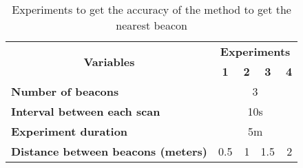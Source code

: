 \begin{table}[]
\centering
\begin{tabular}{@{}lcccc@{}}
\toprule
\multicolumn{1}{c}{\multirow{2}{*}{\textbf{Variables}}} & \multicolumn{4}{c}{\textbf{Experiments}}                                                          \\ \cmidrule(l){2-5}
\multicolumn{1}{c}{}                                    & \textbf{1}              & \textbf{2}            & \textbf{3}              & \textbf{4}            \\ \midrule
\textbf{Number of beacons}                              & \multicolumn{4}{c}{3}                                                                             \\
\textbf{Interval between each scan}                     & \multicolumn{4}{c}{10s}                                                                           \\
\textbf{Experiment duration}                            & \multicolumn{4}{c}{5m}                                                                            \\
\textbf{Distance between beacons (meters)}              & \multicolumn{1}{r}{0.5} & \multicolumn{1}{r}{1} & \multicolumn{1}{r}{1.5} & \multicolumn{1}{r}{2} \\ \bottomrule
\end{tabular}
\caption[Nearest beacon experiments summary]{Experiments to get the accuracy of the method to get the nearest beacon}
\label{tab:experiments_nearest_beacon}
\end{table}
